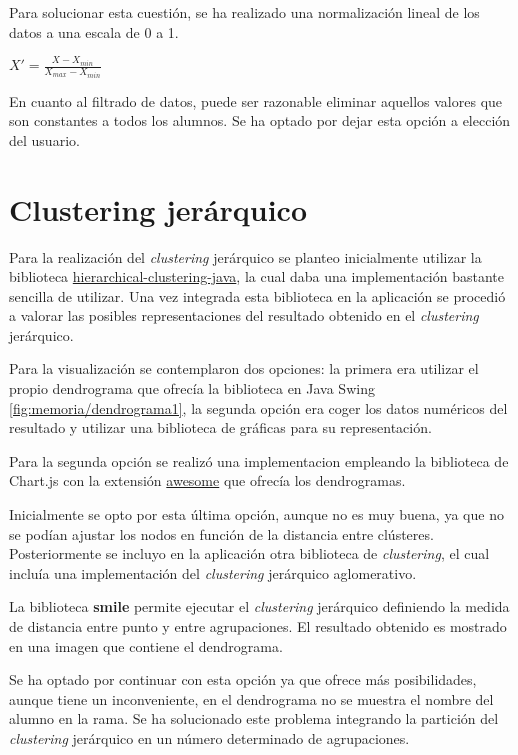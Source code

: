 Para solucionar esta cuestión, se ha realizado una normalización lineal de los datos a una escala de 0 a 1.

$X' = \frac{X - X_{min}}{X_{max} - X_{min}}$

En cuanto al filtrado de datos, puede ser razonable eliminar aquellos valores que son constantes a todos los alumnos. Se ha optado por dejar esta opción a elección del usuario.

\section{Clustering jerárquico}
Para la realización del \emph{clustering} jerárquico se planteo inicialmente utilizar la biblioteca \href{https://github.com/lbehnke/hierarchical-clustering-java}{hierarchical-clustering-java}, la cual daba una implementación bastante sencilla de utilizar. Una vez integrada esta biblioteca en la aplicación se procedió a valorar las posibles representaciones del resultado obtenido en el \emph{clustering} jerárquico.

Para la visualización se contemplaron dos opciones: la primera era utilizar el propio dendrograma que ofrecía la biblioteca en Java Swing \ref{fig:memoria/dendrograma1}, la segunda opción era coger los datos numéricos del resultado y utilizar una biblioteca de gráficas para su representación.

Para la segunda opción se realizó una implementacion empleando la biblioteca de Chart.js con la extensión \href{https://github.com/chartjs/awesome}{awesome} que ofrecía los dendrogramas.

Inicialmente se opto por esta última opción, aunque no es muy buena, ya que no se podían ajustar los nodos en función de la distancia entre clústeres. Posteriormente se incluyo en la aplicación otra biblioteca de \emph{clustering}, el cual incluía una implementación del \emph{clustering} jerárquico aglomerativo.

La biblioteca \textbf{smile} permite ejecutar el \emph{clustering} jerárquico definiendo la medida de distancia entre punto y entre agrupaciones. El resultado obtenido es mostrado en una imagen que contiene el dendrograma.

Se ha optado por continuar con esta opción ya que ofrece más posibilidades, aunque tiene un inconveniente, en el dendrograma no se muestra el nombre del alumno en la rama. Se ha solucionado este problema integrando la partición del \emph{clustering} jerárquico en un número determinado de agrupaciones.

